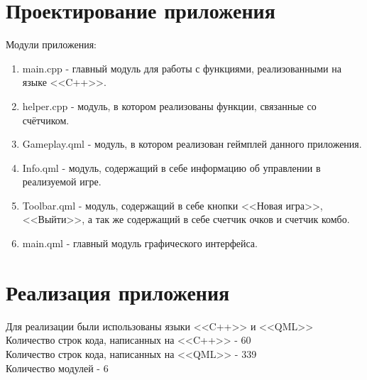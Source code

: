 \documentclass[a4paper,12pt]{article}
\begin{document}
 

\newpage
\section{Проектирование приложения}

Модули приложения:
\begin{enumerate}
    \item main.cpp - главный модуль для работы с функциями, реализованными на языке <<C++>>.
    \item helper.cpp - модуль, в котором реализованы функции, связанные со счётчиком.
    \item Gameplay.qml - модуль, в котором реализован геймплей данного приложения.
    \item Info.qml - модуль, содержащий в себе информацию об управлении в реализуемой игре.
    \item Toolbar.qml - модуль, содержащий в себе кнопки <<Новая игра>>, <<Выйти>>, а так же содержащий в себе счетчик очков и счетчик комбо.
    \item main.qml - главный модуль графического интерфейса.
\end{enumerate}


\newpage
\section{Реализация приложения}

Для реализации были использованы языки <<C++>> и <<QML>>\\
Количество строк кода, написанных на <<C++>> - 60 \\
Количество строк кода, написанных на <<QML>> - 339 \\
Количество модулей - 6






\end{document}
